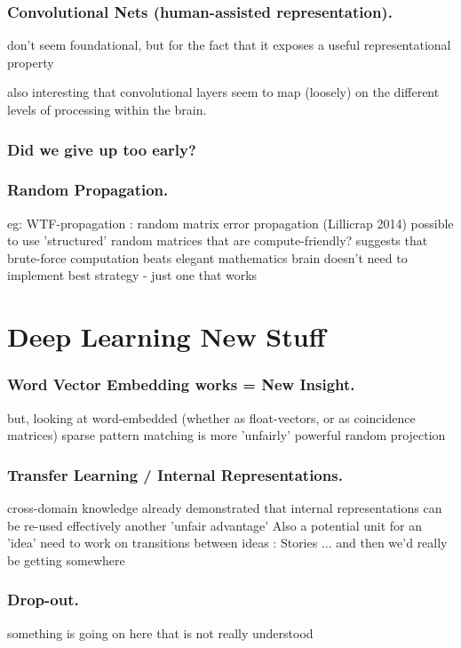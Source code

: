 \documentclass[citeauthoryear]{llncs}
\begin{document}
\subsubsection*{Convolutional Nets (human-assisted representation).}
don't seem foundational, but for the fact that it exposes a useful representational property

also interesting that convolutional layers seem to map (loosely) on the 
different levels of processing within the brain.

\subsubsection*{Did we give up too early?}
 
\subsubsection*{Random Propagation.}
    eg: WTF-propagation : random matrix error propagation (Lillicrap 2014)
      possible to use 'structured' random matrices that are compute-friendly?
      suggests that brute-force computation beats elegant mathematics
        brain doesn't need to implement best strategy - just one that works

 
\section{Deep Learning New Stuff}


\subsubsection*{Word Vector Embedding works = New Insight.}
    but, looking at word-embedded (whether as float-vectors, or as coincidence matrices)
      sparse pattern matching is more 'unfairly' powerful 
      random projection

\subsubsection*{Transfer Learning / Internal Representations.}
  cross-domain knowledge
    already demonstrated that internal representations can be re-used effectively
    another 'unfair advantage'
  Also a potential unit for an 'idea'
    need to work on transitions between ideas : Stories
      ... and then we'd really be getting somewhere


\subsubsection*{Drop-out.}
    something is going on here that is not really understood
\end{document}
